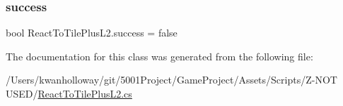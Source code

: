 \subsubsection{\texorpdfstring{success}{success}}
{\footnotesize\ttfamily bool React\+To\+Tile\+Plus\+L2.\+success = false}



The documentation for this class was generated from the following file\+:\begin{DoxyCompactItemize}
\item 
/\+Users/kwanholloway/git/5001\+Project/\+Game\+Project/\+Assets/\+Scripts/\+Z-\/\+N\+O\+T U\+S\+E\+D/\hyperlink{_react_to_tile_plus_l2_8cs}{React\+To\+Tile\+Plus\+L2.\+cs}\end{DoxyCompactItemize}
